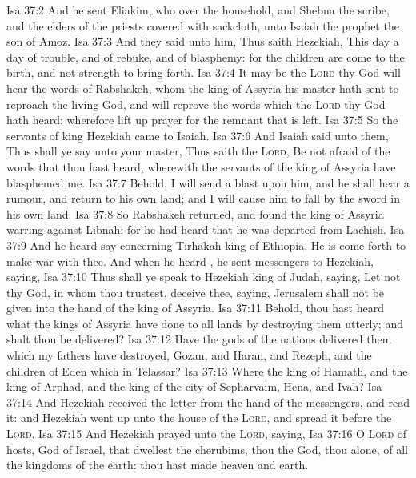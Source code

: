 \vs Isa 37:2 And he sent Eliakim, who  over the household, and Shebna the scribe, and the elders of the priests covered with sackcloth, unto Isaiah the prophet the son of Amoz.
\vs Isa 37:3 And they said unto him, Thus saith Hezekiah, This day  a day of trouble, and of rebuke, and of blasphemy: for the children are come to the birth, and  not strength to bring forth.
\vs Isa 37:4 It may be the \textsc{Lord} thy God will hear the words of Rabshakeh, whom the king of Assyria his master hath sent to reproach the living God, and will reprove the words which the \textsc{Lord} thy God hath heard: wherefore lift up  prayer for the remnant that is left.
\vs Isa 37:5 So the servants of king Hezekiah came to Isaiah.
\vs Isa 37:6 And Isaiah said unto them, Thus shall ye say unto your master, Thus saith the \textsc{Lord}, Be not afraid of the words that thou hast heard, wherewith the servants of the king of Assyria have blasphemed me.
\vs Isa 37:7 Behold, I will send a blast upon him, and he shall hear a rumour, and return to his own land; and I will cause him to fall by the sword in his own land.
\vs Isa 37:8 So Rabshakeh returned, and found the king of Assyria warring against Libnah: for he had heard that he was departed from Lachish.
\vs Isa 37:9 And he heard say concerning Tirhakah king of Ethiopia, He is come forth to make war with thee. And when he heard , he sent messengers to Hezekiah, saying,
\vs Isa 37:10 Thus shall ye speak to Hezekiah king of Judah, saying, Let not thy God, in whom thou trustest, deceive thee, saying, Jerusalem shall not be given into the hand of the king of Assyria.
\vs Isa 37:11 Behold, thou hast heard what the kings of Assyria have done to all lands by destroying them utterly; and shalt thou be delivered?
\vs Isa 37:12 Have the gods of the nations delivered them which my fathers have destroyed,  Gozan, and Haran, and Rezeph, and the children of Eden which  in Telassar?
\vs Isa 37:13 Where  the king of Hamath, and the king of Arphad, and the king of the city of Sepharvaim, Hena, and Ivah?
\vs Isa 37:14 And Hezekiah received the letter from the hand of the messengers, and read it: and Hezekiah went up unto the house of the \textsc{Lord}, and spread it before the \textsc{Lord}.
\vs Isa 37:15 And Hezekiah prayed unto the \textsc{Lord}, saying,
\vs Isa 37:16 O \textsc{Lord} of hosts, God of Israel, that dwellest  the cherubims, thou  the God,  thou alone, of all the kingdoms of the earth: thou hast made heaven and earth.
